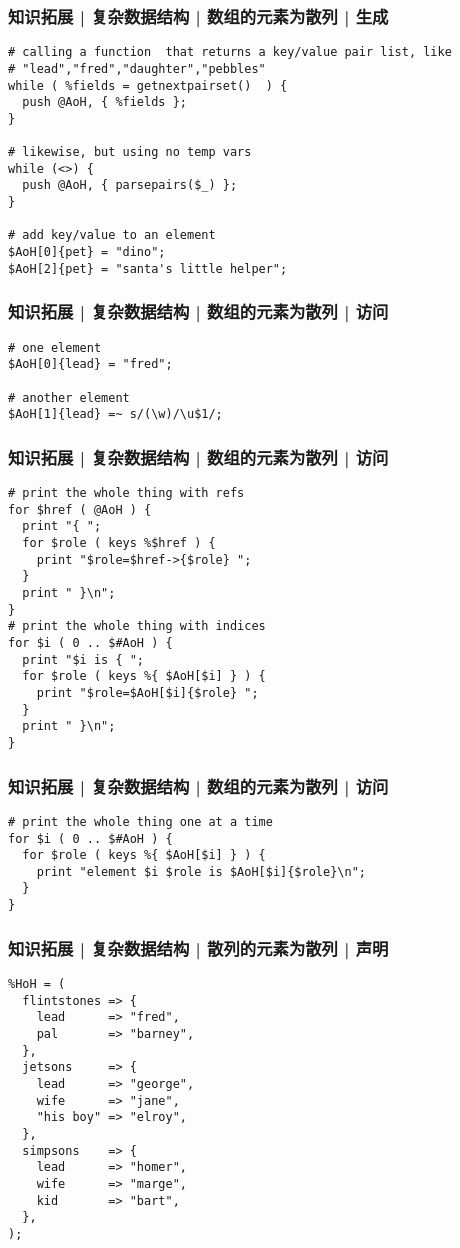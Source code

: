 \begin{frame}[fragile]
  \frametitle{知识拓展 | 复杂数据结构 | 数组的元素为散列 | 生成}
\begin{lstlisting}
# calling a function  that returns a key/value pair list, like
# "lead","fred","daughter","pebbles"
while ( %fields = getnextpairset()  ) {
  push @AoH, { %fields };
}

# likewise, but using no temp vars
while (<>) {
  push @AoH, { parsepairs($_) };
}

# add key/value to an element
$AoH[0]{pet} = "dino";
$AoH[2]{pet} = "santa's little helper";
\end{lstlisting}
\end{frame}

\begin{frame}[fragile]
  \frametitle{知识拓展 | 复杂数据结构 | 数组的元素为散列 | 访问}
\begin{lstlisting}
# one element
$AoH[0]{lead} = "fred";

# another element
$AoH[1]{lead} =~ s/(\w)/\u$1/;
\end{lstlisting}
\end{frame}

\begin{frame}[fragile]
  \frametitle{知识拓展 | 复杂数据结构 | 数组的元素为散列 | 访问}
  \vspace{-0.8em}
\begin{lstlisting}
# print the whole thing with refs
for $href ( @AoH ) {
  print "{ ";
  for $role ( keys %$href ) {
    print "$role=$href->{$role} ";
  }
  print " }\n";
}
# print the whole thing with indices
for $i ( 0 .. $#AoH ) {
  print "$i is { ";
  for $role ( keys %{ $AoH[$i] } ) {
    print "$role=$AoH[$i]{$role} ";
  }
  print " }\n";
}
\end{lstlisting}
\end{frame}

\begin{frame}[fragile]
  \frametitle{知识拓展 | 复杂数据结构 | 数组的元素为散列 | 访问}
\begin{lstlisting}
# print the whole thing one at a time
for $i ( 0 .. $#AoH ) {
  for $role ( keys %{ $AoH[$i] } ) {
    print "element $i $role is $AoH[$i]{$role}\n";
  }
}
\end{lstlisting}
\end{frame}

\begin{frame}[fragile]
  \frametitle{知识拓展 | 复杂数据结构 | 散列的元素为散列 | 声明}
  \vspace{-0.8em}
\begin{lstlisting}
%HoH = (
  flintstones => {
    lead      => "fred",
    pal       => "barney",
  },
  jetsons     => {
    lead      => "george",
    wife      => "jane",
    "his boy" => "elroy",
  },
  simpsons    => {
    lead      => "homer",
    wife      => "marge",
    kid       => "bart",
  },
);
\end{lstlisting}
\end{frame}


